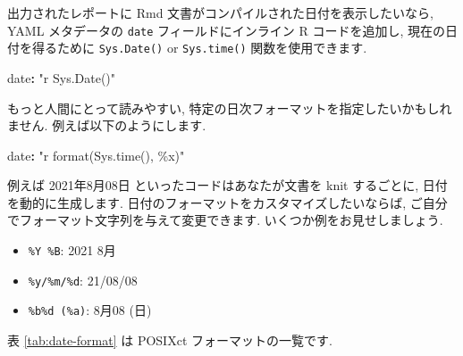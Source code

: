 \documentclass[
  11pt,
  lualatex,ja=standard,jafont=noto]{bxjsreport}
\newenvironment{Shaded}{\begin{snugshade}}{\end{snugshade}}
\newcommand{\AttributeTok}[1]{\textcolor[rgb]{0.77,0.63,0.00}{#1}}
\newcommand{\FunctionTok}[1]{\textcolor[rgb]{0.00,0.00,0.00}{#1}}
\newcommand{\KeywordTok}[1]{\textcolor[rgb]{0.13,0.29,0.53}{\textbf{#1}}}
\newcommand{\StringTok}[1]{\textcolor[rgb]{0.31,0.60,0.02}{#1}}
\providecommand{\tightlist}{%
  \setlength{\itemsep}{0pt}\setlength{\parskip}{0pt}}
\begin{document}
出力されたレポートに Rmd 文書がコンパイルされた日付を表示したいなら, YAML メタデータの \texttt{date} フィールドにインライン R コードを追加し, 現在の日付を得るために \texttt{Sys.Date()} or \texttt{Sys.time()} 関数を使用できます.

\begin{Shaded}
\begin{Highlighting}[]
\FunctionTok{date}\KeywordTok{:}\AttributeTok{ }\StringTok{"\textasciigrave{}r Sys.Date()\textasciigrave{}"}
\end{Highlighting}
\end{Shaded}

もっと人間にとって読みやすい, 特定の日次フォーマットを指定したいかもしれません. 例えば以下のようにします.

\begin{Shaded}
\begin{Highlighting}[]
\FunctionTok{date}\KeywordTok{:}\AttributeTok{ }\StringTok{"\textasciigrave{}r format(Sys.time(), \textquotesingle{}\%x\textquotesingle{})\textasciigrave{}"}
\end{Highlighting}
\end{Shaded}

例えば 2021年8月08日 といったコードはあなたが文書を knit するごとに, 日付を動的に生成します. 日付のフォーマットをカスタマイズしたいならば, ご自分でフォーマット文字列を与えて変更できます. いくつか例をお見せしましょう.

\begin{itemize}
\tightlist
\item
  \texttt{\%Y \%B}: 2021 8月
\item
  \texttt{\%y/\%m/\%d}: 21/08/08
\item
  \texttt{\%b\%d (\%a)}: 8月08 (日)
\end{itemize}

表 \ref{tab:date-format} は POSIXct フォーマットの一覧です.
\end{document}
